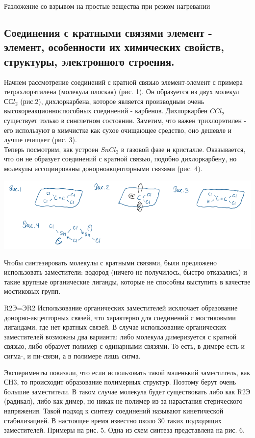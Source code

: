 \documentclass[14pt,a4paper]{scrartcl}
\begin{document}
Разложение со взрывом на простые вещества при резком нагревании

\subsection{Соединения с кратными связями элемент - элемент, особенности их химических свойств, структуры, электронного строения.}

Начнем рассмотрение соединений с кратной связью элемент-элемент с примера тетрахлорэтилена (молекула плоская) (рис. 1). Он образуется из двух молекул $ССl_2$ (рис.2), дихлоркарбена, которое
является производным очень высокореакционноспособных соединений - карбенов. Дихлоркарбен $CCl_2$ существует только в синглетном состоянии. Заметим, что важен трихлорэтилен - его
используют в химчистке как сухое очищающее средство, оно дешевле и лучше очищает (рис. 3).\\

Теперь посмотрим, как устроен $SnCl_2$ в газовой фазе и кристалле. Оказывается, что он не образует соединений с кратной связью, подобно дихлоркарбену, но молекулы ассоциированы донорноакцепторными связями (рис. 4).

\includegraphics{14v1.png}

Чтобы синтезировать молекулы с кратными связями, были предложено использовать заместители: водород (ничего не получилось, быстро отказались) и такие крупные органические лиганды,
которые не способны выступить в качестве мостиковых групп.

R2Э=ЭR2
Использование органических заместителей исключает образование донорно-акцепторных связей, что характерно для соединений с мостиковыми лигандами, где нет кратных связей. В случае
использование органических заместителей возможны два варианта: либо молекула димеризуется с кратной связью, либо образует полимер с одинарными связями. То есть, в димере есть и сигма-,
и пи-связи, а в полимере лишь сигма.

Эксперименты показали, что если использовать такой маленький заместитель, как СН3, то происходит образование полимерных структур. Поэтому берут очень большие заместители. В таком
случае молекула будет существовать либо как R2Э (радикал), либо как димер, но никак не полимер из-за нарастания стерического напряжения. Такой подход к синтезу соединений называют
кинетической стабилизацией. В настоящее время известно около 30 таких подходящих заместителей. Примеры на рис. 5. Одна из схем синтеза представлена на рис. 6. 
\end{document}
